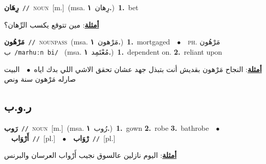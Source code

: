\documentclass[10pt,a4paper,twoside]{article} %
\begin{document}
\begin{multicols}{2}
{\setlength\topsep{0pt}\textbf{\foreignlanguage{arabic}{رِهَان}}\ {\color{gray}\texttt{//}\color{black}}\ \textsc{noun}\ [m.]\ \color{gray}(msa. \foreignlanguage{arabic}{رِهان}~\foreignlanguage{arabic}{\textbf{١.}})\color{black}\ \textbf{1.}~bet\  \begin{flushright}\color{gray}\foreignlanguage{arabic}{\textbf{\underline{\foreignlanguage{arabic}{أمثلة}}}: مين تتوقع يكسب الرِّهان؟}\end{flushright}\color{black}} \vspace{2mm}

{\setlength\topsep{0pt}\textbf{\foreignlanguage{arabic}{مَرْهُون}}\ {\color{gray}\texttt{//}\color{black}}\ \textsc{noun\textunderscore pass}\ \color{gray}(msa. \foreignlanguage{arabic}{مَرْهون}~\foreignlanguage{arabic}{\textbf{١.}})\color{black}\ \textbf{1.}~mortgaged\ \ $\bullet$\ \ \textsc{ph.} \color{gray} \foreignlanguage{arabic}{مَرْهُون ب}\color{black}\ {\color{gray}\texttt{/{\sffamily marhuːn bi}/}\color{black}}\ \color{gray} (msa. \foreignlanguage{arabic}{مُعْتَمِد}~\foreignlanguage{arabic}{\textbf{١.}})\color{black}\ \textbf{1.}~dependent on.  \textbf{2.}~reliant upon\  \begin{flushright}\color{gray}\foreignlanguage{arabic}{\textbf{\underline{\foreignlanguage{arabic}{أمثلة}}}: النجاح مَرْهون بقديش أنت بتبذل جهد عشان تحقق الاشي اللي بدك اياه\ $\bullet$\ \  البيت صارله مَرْهون سنة ونص}\end{flushright}\color{black}} \vspace{2mm}

\vspace{-3mm}
\subsection*{\color{blue}\foreignlanguage{arabic}{ر.و.ب}\color{blue}{}} 

{\setlength\topsep{0pt}\textbf{\foreignlanguage{arabic}{رَوب}}\ {\color{gray}\texttt{//}\color{black}}\ \textsc{noun}\ [m.]\ \color{gray}(msa. \foreignlanguage{arabic}{رُوب}~\foreignlanguage{arabic}{\textbf{١.}})\color{black}\ \textbf{1.}~gown  \textbf{2.}~robe  \textbf{3.}~bathrobe\ \ $\bullet$\ \ \setlength\topsep{0pt}\textbf{\foreignlanguage{arabic}{أَرْوَاب}}\ {\color{gray}\texttt{//}\color{black}}\ [pl.]\ \ $\bullet$\ \ \setlength\topsep{0pt}\textbf{\foreignlanguage{arabic}{رْوَاب}}\ {\color{gray}\texttt{//}\color{black}}\ [pl.]\  \begin{flushright}\color{gray}\foreignlanguage{arabic}{\textbf{\underline{\foreignlanguage{arabic}{أمثلة}}}: اليوم نازلين عالسوق نجيب أَرْواب العرسان والبرنس}\end{flushright}\color{black}} \vspace{2mm}


\end{multicols}
\end{document}
